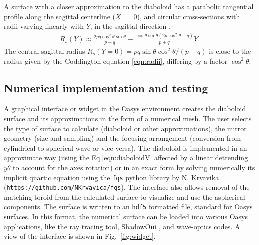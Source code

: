 \documentclass{iucr}       %
\newcommand{\inred}[1]{{\color{red}#1}}
\begin{document}


A surface with a closer approximation to the diaboloid has a parabolic tangential profile along the sagittal centerline ($X$~=~0), and circular cross-sections with radii varying linearly with $Y$, in the sagittal direction \cite{val2021}.
\begin{multline}
\label{eq:sagRadius}
R_s(Y) 
\approx 
\frac{2p q \cos^2\theta \sin\theta }{p + q} - 
\frac{\cos\theta \sin\theta (2 p \cos^2\theta - q)}{p + q} Y.
\end{multline}
The central sagittal radius $R_s(Y=0)=p q \sin\theta \cos^2\theta/ (p+q)$ is close to the radius given by the Coddington equation \ref{eqn:radii}, differing by a factor $\cos^2\theta$.


\subsection{Numerical implementation and testing}
\label{sec:oasys}

A graphical interface or widget in the Oasys environment creates the diaboloid surface and its approximations in the form of a numerical mesh. The user selects the type of surface to calculate (diaboloid or other approximations), the mirror geometry (size and sampling) and the focusing arrangement (conversion from cylindrical to spherical wave or vice-versa). 
The diaboloid is implemented in an approximate way (using the Eq.\ref{eqn:diaboloidV} affected by a linear detrending $y\theta$ to account for the axes rotation) or in an exact form by solving numerically its implicit quartic equation \inred{\cite{val2021}} using the {\tt fqs} python library by N. Krvavika ({\tt https://github.com/NKrvavica/fqs}). 
The interface also allows removal of the matching toroid from the calculated surface to visualize and use the aspherical components. The surface is written to an {\tt hdf5} formatted file, standard for Oasys surfaces. In this format, the numerical surface can be loaded into various Oasys applications, like the ray tracing tool, ShadowOui \cite{codeSHADOWOUI}, and wave-optics codes. A view of the interface is shown in Fig.~\ref{fig:widget}.
\end{document}
